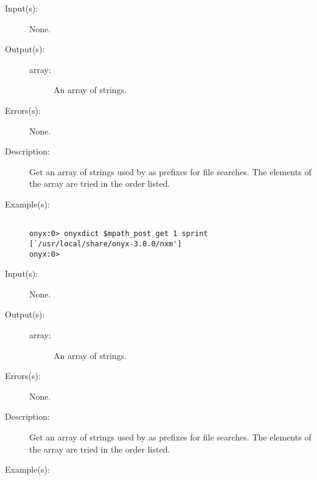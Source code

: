 \begin{description}
\label{onyxdict:mpath_post}
\item[{\onyxop{--}{mpath\_post}{array}}: ]
	\begin{description}\item[]
	\item[Input(s): ] None.
	\item[Output(s): ]
		\begin{description}\item[]
		\item[array: ]
			An array of strings.
		\end{description}
	\item[Errors(s): ] None.
	\item[Description: ]
		Get an array of strings used by
		 as prefixes for file
		searches.  The elements of the array are tried in the order
		listed.
	\item[Example(s): ]\begin{verbatim}

onyx:0> onyxdict $mpath_post get 1 sprint
[`/usr/local/share/onyx-3.0.0/nxm']
onyx:0>
		\end{verbatim}
	\end{description}
\label{onyxdict:mpath_pre}
\item[{\onyxop{--}{mpath\_pre}{array}}: ]
	\begin{description}\item[]
	\item[Input(s): ] None.
	\item[Output(s): ]
		\begin{description}\item[]
		\item[array: ]
			An array of strings.
		\end{description}
	\item[Errors(s): ] None.
	\item[Description: ]
		Get an array of strings used by
		 as prefixes for file
		searches.  The elements of the array are tried in the order
		listed.
	\item[Example(s): ]\begin{verbatim}


\end{verbatim}
\end{description}
\end{description}
